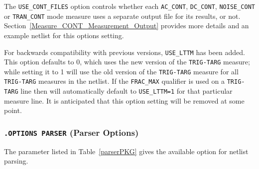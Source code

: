 The \texttt{USE\_CONT\_FILES} option controls whether each \texttt{AC\_CONT},
\texttt{DC\_CONT}, \texttt{NOISE\_CONT} or \texttt{TRAN\_CONT} mode measure uses
a separate output file for its results, or not. Section~\ref{Measure_CONT_Measurement_Output}
provides more details and an example netlist for this options setting.

For backwards compatibility with previous \Xyce{} versions, \texttt{USE\_LTTM} has
been added.  This option defaults to 0, which uses the new version of the \texttt{TRIG-TARG}
measure; while setting it to 1 will use the old version of the \texttt{TRIG-TARG} measure
for all \texttt{TRIG-TARG} measures in the netlist.  If the \texttt{FRAC\_MAX} qualifier
is used on a \texttt{TRIG-TARG} line then \Xyce{} will automatically default to
\texttt{USE\_LTTM=1} for that particular measure line.  It is anticipated that this
option setting will be removed at some point.



\subsubsection{\texttt{.OPTIONS PARSER} (Parser Options)}
The parameter listed in Table~\ref{parserPKG} gives the available
option for netlist parsing.




